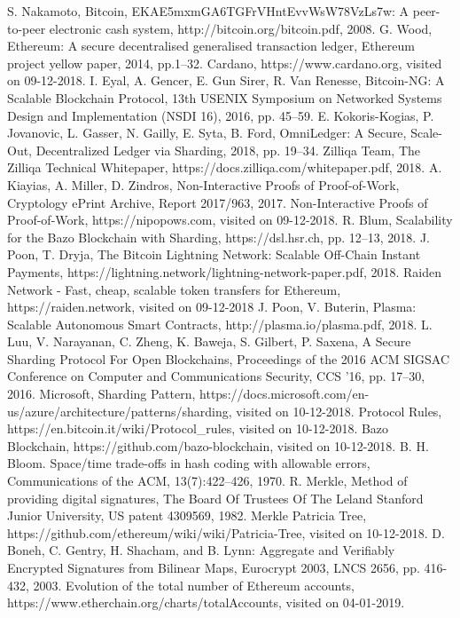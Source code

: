 \documentclass[conference]{IEEEtran}
\begin{document}
\begin{thebibliography}{00}
 S. Nakamoto, Bitcoin, EKAE5mxmGA6TGFrVHntEvvWsW78VzLs7w: A peer-to-peer electronic cash system, http://bitcoin.org/bitcoin.pdf, 2008.
 G. Wood, Ethereum: A secure decentralised generalised transaction ledger, Ethereum project yellow paper, 2014, pp.1--32.
 Cardano, https://www.cardano.org, visited on 09-12-2018.
 I. Eyal, A. Gencer, E. Gun Sirer, R. Van Renesse, Bitcoin-NG: A Scalable Blockchain Protocol, 13th {USENIX} Symposium on Networked Systems Design and Implementation ({NSDI} 16), 2016, pp. 45--59.
 E. Kokoris-Kogias, P. Jovanovic, L. Gasser, N. Gailly, E. Syta, B. Ford, OmniLedger: A Secure, Scale-Out, Decentralized Ledger via Sharding, 2018, pp. 19--34.
 Zilliqa Team, The Zilliqa Technical Whitepaper, https://docs.zilliqa.com/whitepaper.pdf, 2018.
 A. Kiayias, A. Miller, D. Zindros, Non-Interactive Proofs of Proof-of-Work, Cryptology ePrint Archive, Report 2017/963, 2017.
 Non-Interactive Proofs of Proof-of-Work, https://nipopows.com, visited on 09-12-2018.
 R. Blum, Scalability for the Bazo Blockchain with Sharding, https://dsl.hsr.ch, pp. 12--13, 2018.
 J. Poon, T. Dryja, The Bitcoin Lightning Network: Scalable Off-Chain Instant Payments, https://lightning.network/lightning-network-paper.pdf, 2018.
 Raiden Network - Fast, cheap, scalable token transfers for Ethereum, https://raiden.network, visited on 09-12-2018
 J. Poon, V. Buterin, Plasma: Scalable Autonomous Smart Contracts, http://plasma.io/plasma.pdf, 2018.
 L. Luu, V. Narayanan, C. Zheng, K. Baweja, S. Gilbert, P. Saxena, A Secure Sharding Protocol For Open Blockchains, Proceedings of the 2016 ACM SIGSAC Conference on Computer and Communications Security, CCS '16, pp. 17--30, 2016.
 Microsoft, Sharding Pattern, https://docs.microsoft.com/en-us/azure/architecture/patterns/sharding, visited on 10-12-2018.
 Protocol Rules, https://en.bitcoin.it/wiki/Protocol\_rules, visited on 10-12-2018.
 Bazo Blockchain, https://github.com/bazo-blockchain, visited on 10-12-2018.
 B. H. Bloom. Space/time trade-offs in hash coding with allowable errors, Communications of the ACM, 13(7):422–426, 1970.
 R. Merkle, Method of providing digital signatures, The Board Of Trustees Of The Leland Stanford Junior University, US patent 4309569, 1982.
 Merkle Patricia Tree, https://github.com/ethereum/wiki/wiki/Patricia-Tree, visited on 10-12-2018.
 D. Boneh, C. Gentry, H. Shacham, and B. Lynn: Aggregate and Verifiably Encrypted Signatures from Bilinear Maps, Eurocrypt 2003, LNCS 2656, pp. 416-432, 2003.
 Evolution of the total number of Ethereum accounts, https://www.etherchain.org/charts/totalAccounts, visited on 04-01-2019.

\end{thebibliography}
\end{document}
